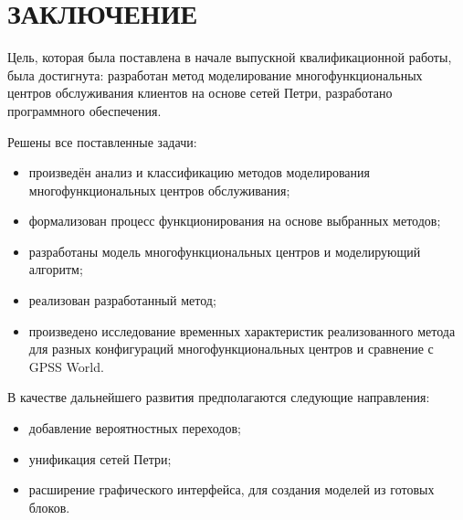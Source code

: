 \chapter*{ЗАКЛЮЧЕНИЕ}

Цель, которая была поставлена в начале выпускной квалификационной  работы, была достигнута: разработан метод моделирование многофункциональных центров обслуживания клиентов на основе сетей Петри, разработано программного обеспечения.

Решены все поставленные задачи:
\begin{itemize}[label=---]
	\item произведён анализ и классификацию методов моделирования многофункциональных центров обслуживания;
	\item формализован процесс функционирования на основе выбранных методов;
	\item разработаны модель многофункциональных центров и моделирующий алгоритм;
	\item реализован разработанный метод; 
	\item произведено исследование временных характеристик реализованного метода для разных конфигураций многофункциональных центров и сравнение с GPSS World.
\end{itemize}

В качестве дальнейшего развития предполагаются следующие направления:
\begin{itemize}[label=---]
	\item добавление вероятностных переходов;
	\item унификация сетей Петри;
	\item расширение графического интерфейса, для создания моделей из готовых блоков.
\end{itemize}